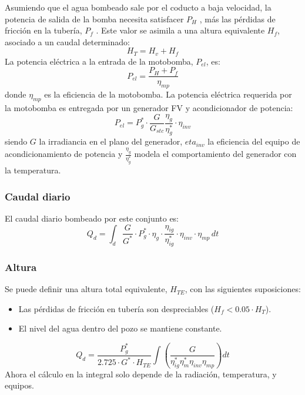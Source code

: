 Asumiendo que el agua bombeado sale por el coducto a baja velocidad, la potencia de salida de la bomba necesita satisfacer \(P_H\) , más las pérdidas de fricción en la tubería, \(P_f\) . Este valor se asimila a una altura equivalente \(H_f\),  asociado a un caudal determinado: 
\begin{equation}
H_T=H_v+H_f
\end{equation}
La potencia eléctrica a la entrada de la motobomba, \(P_{el}\), es:
\begin{equation}
P_{el}=\frac{P_H+P_f}{\eta_{mp}} 
\end{equation}
donde \(\eta_{mp}\) es la eficiencia de la motobomba.
La potencia eléctrica requerida por la motobomba es entregada por un generador FV y acondicionador de potencia:
\begin{equation}
P_{el}=P_g^* \cdot \frac{G}{G_{stc}} \frac{\eta_g}{\eta_g^*} \cdot \eta_{inv}
\end{equation}
siendo \(G\) la irradiancia en el plano del generador, \(eta_{inv}\) la eficiencia del equipo de acondicionamiento de potencia y \(\frac{\eta_g}{\eta_g^*}\) modela el comportamiento del generador con la temperatura.

\subsubsection{Caudal diario}
\label{sec:org59d8b22}
El caudal diario bombeado por este conjunto es:
\begin{equation}
Q_d = \int_{d} \frac{G}{G^*} \cdot P_g^* \cdot \eta_g \cdot \frac{\eta_{ig}}{\eta_{ig}^*} \cdot \eta_{inv} \cdot \eta_{mp} \, dt
\end{equation}

\subsubsection{Altura}
\label{sec:orgc1d5644}
Se puede definir una altura total equivalente, \(H_{TE}\), con las siguientes suposiciones:
\begin{itemize}
\item Las pérdidas de fricción en tubería son despreciables (\(H_f < 0.05 \cdot H_T\)).
\item El nivel del agua dentro del pozo se mantiene constante.
\end{itemize}
\begin{equation}
Q_d = \frac{P^*_g}{2.725 \cdot G^* \cdot H_{TE}} \int \left( \frac{G}{\eta_{ig}^{*} \eta_{m}^{*} \eta_{inv} \eta_{mp}} \right) dt
\end{equation}
Ahora el cálculo en la integral solo depende de la radiación, temperatura, y equipos.

